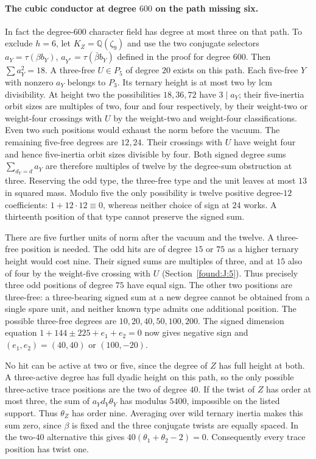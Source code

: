 \documentclass[11pt,a4paper]{article}
\numberwithin{equation}{section}
\theoremstyle{remark}
\newcommand{\QQ}{\mathbb Q}
\begin{document}
\paragraph{The cubic conductor at degree $600$ on the path missing six.}\label{por:field600-sep}
In fact the degree-$600$ character field has degree at most three on that path. To exclude $h=6$, let $K_Z=\QQ(\zeta_9)$ and use the two conjugate selectors $a_Y=\tau(\beta b_Y)$, $a_{Y^*}=\tau(\bar\beta b_Y)$ defined in the proof for degree $600$. Then $\sum a_Y^2=18$. A three-free $U\in P_5$ of degree $20$ exists on this path. Each five-free $Y$ with nonzero $a_Y$ belongs to $P_3$. Its ternary height is at most two by lcm divisibility. At height two the possibilities $18,36,72$ have $3\mid a_Y$; their five-inertia orbit sizes are multiples of two, four and four respectively, by their weight-two or weight-four crossings with $U$ by the weight-two and weight-four classifications. Even two such positions would exhaust the norm before the vacuum. The remaining five-free degrees are $12,24$. Their crossings with $U$ have weight four and hence five-inertia orbit sizes divisible by four. Both signed degree sums $\sum_{d_Y=d}a_Y$ are therefore multiples of twelve by the degree-sum obstruction at three. Reserving the odd type, the three-free type and the unit leaves at most $13$ in squared mass. Modulo five the only possibility is twelve positive degree-$12$ coefficients: $1+12\cdot12\equiv0$, whereas neither choice of sign at $24$ works. A thirteenth position of that type cannot preserve the signed sum.

There are five further units of norm after the vacuum and the twelve. A three-free position is needed. The odd hits are of degree $15$ or $75$ as a higher ternary height would cost nine. Their signed sums are multiples of three, and at $15$ also of four by the weight-five crossing with $U$ (Section~\ref{found:J:5}). Thus precisely three odd positions of degree $75$ have equal sign. The other two positions are three-free: a three-bearing signed sum at a new degree cannot be obtained from a single spare unit, and neither known type admits one additional position. The possible three-free degrees are $10,20,40,50,100,200$. The signed dimension equation $1+144\pm225+e_1+e_2=0$ now gives negative sign and $(e_1,e_2)=(40,40)$ or $(100,-20)$.

No hit can be active at two or five, since the degree of $Z$ has full height at both. A three-active degree has full dyadic height on this path, so the only possible three-active trace positions are the two of degree $40$. If the twist of $Z$ has order at most three, the sum of $a_Y d_Y\theta_Y$ has modulus $5400$, impossible on the listed support. Thus $\theta_Z$ has order nine. Averaging over wild ternary inertia makes this sum zero, since $\beta$ is fixed and the three conjugate twists are equally spaced. In the two-$40$ alternative this gives $40(\theta_1+\theta_2-2)=0$. Consequently every trace position has twist one.
\end{document}
